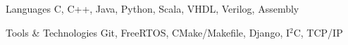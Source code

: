 
\begin{cvskills}
  \cvskill
    {Languages} %
    {C, C++, Java, Python, Scala, VHDL, Verilog, Assembly} %

  \cvskill
    {Tools \& Technologies} %
    {Git, FreeRTOS, CMake/Makefile, Django, I$^2$C, TCP/IP} %
  
\end{cvskills}
